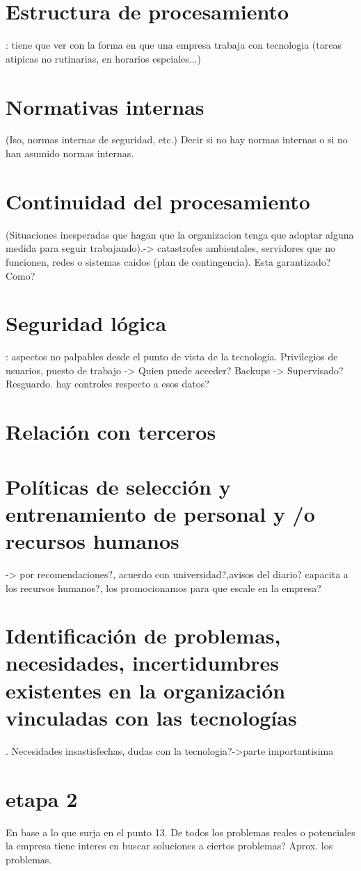 \documentclass[10pt,a4paper,final]{article}
\begin{document}
\section{Estructura de procesamiento}
: tiene que ver con la forma en que una empresa trabaja con tecnologia (tareas atipicas no rutinarias, en horarios espciales...)
\section{Normativas internas}
 (Iso, normas internas de seguridad, etc.) Decir si no hay normas internas o si no han asumido normas internas.
\section{Continuidad del procesamiento}
 (Situaciones inesperadas que hagan que la organizacion tenga que adoptar alguna medida para seguir trabajando).-> catastrofes ambientales, servidores que no funcionen, redes o sistemas caidos (plan de contingencia). Esta garantizado? Como?
\section{Seguridad lógica}
: aspectos no palpables desde el punto de vista de la tecnologia. Privilegios de usuarios, puesto de trabajo -> Quien puede acceder? Backups -> Supervisado? Resguardo. hay controles respecto a esos datos?
\section{Relación con terceros}
\section{Políticas de selección y entrenamiento de personal y /o recursos humanos}
 -> por recomendaciones?, acuerdo con universidad?,avisos del diario? capacita a los recursos humanos?, los promocionamos para que escale en la empresa?
\section{Identificación de problemas, necesidades, incertidumbres existentes en la organización vinculadas con las tecnologías}. Necesidades insastisfechas, dudas con la tecnologia?->parte importantisima

\section{etapa 2}
En base a lo que surja en el punto 13. De todos los problemas reales o potenciales la empresa tiene interes en buscar soluciones a ciertos problemas?
Aprox. los problemas.
\end{document}

